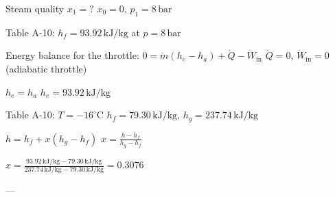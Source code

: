 Steam quality \( x_1 = ? \)  
\( x_0 = 0 \), \( p_1 = 8 \, \text{bar} \)  

Table A-10:  
\( h_f = 93.92 \, \text{kJ/kg} \) at \( p = 8 \, \text{bar} \)  

Energy balance for the throttle:  
\( 0 = \dot{m} (h_e - h_a) + \dot{Q} - \dot{W}_{\text{in}} \)  
\( \dot{Q} = 0 \), \( \dot{W}_{\text{in}} = 0 \) (adiabatic throttle)  

\( h_e = h_a \)  
\( h_e = 93.92 \, \text{kJ/kg} \)  

Table A-10:  
\( T = -16^\circ \text{C} \)  
\( h_f = 79.30 \, \text{kJ/kg} \), \( h_g = 237.74 \, \text{kJ/kg} \)  

\( h = h_f + x (h_g - h_f) \)  
\( x = \frac{h - h_f}{h_g - h_f} \)  

\( x = \frac{93.92 \, \text{kJ/kg} - 79.30 \, \text{kJ/kg}}{237.74 \, \text{kJ/kg} - 79.30 \, \text{kJ/kg}} = 0.3076 \)  

---